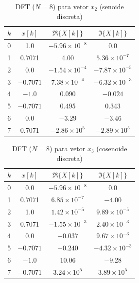 \documentclass[12pt,a4paper]{article}
\begin{document}
\begin{table}[H]
\centering
\small
\caption{DFT ($N=8$) para vetor $x_2$ (senoide discreta)}
\label{tab:dft_x2}
\begin{tabular}{@{}c c c c@{}}
\toprule
\textbf{$k$} & \textbf{$x[k]$} & \textbf{$\Re\{X[k]\}$} & \textbf{$\Im\{X[k]\}$} \\
\midrule
0 & 1.0     & $-5.96\times10^{-8}$ & 0.0 \\
1 & 0.7071  & 4.00              & $5.36\times10^{-7}$ \\
2 & 0.0     & $-1.54\times10^{-4}$ & $-7.87\times10^{-5}$ \\
3 & $-0.7071$ & $7.38\times10^{-4}$ & $-6.32\times10^{-3}$ \\
4 & $-1.0$  & 0.090             & $-0.024$ \\
5 & $-0.7071$ & 0.495             & 0.343 \\
6 & 0.0     & $-3.29$           & $-3.46$ \\
7 & 0.7071  & $-2.86\times10^{5}$ & $-2.89\times10^{5}$ \\
\bottomrule
\end{tabular}
\end{table}

\begin{table}[H]
\centering
\small
\caption{DFT ($N=8$) para vetor $x_3$ (cosenoide discreta)}
\label{tab:dft_x3}
\begin{tabular}{@{}c c c c@{}}
\toprule
\textbf{$k$} & \textbf{$x[k]$} & \textbf{$\Re\{X[k]\}$} & \textbf{$\Im\{X[k]\}$} \\
\midrule
0 & 0.0     & $-5.96\times10^{-8}$ & 0.0 \\
1 & 0.7071  & $6.85\times10^{-7}$ & $-4.00$ \\
2 & 1.0     & $1.42\times10^{-5}$ & $9.89\times10^{-5}$ \\
3 & 0.7071  & $-1.55\times10^{-3}$ & $2.40\times10^{-3}$ \\
4 & 0.0     & $-0.037$          & $9.67\times10^{-3}$ \\
5 & $-0.7071$ & $-0.240$          & $-4.32\times10^{-3}$ \\
6 & $-1.0$  & 10.06             & $-9.28$ \\
7 & $-0.7071$ & $3.24\times10^{5}$ & $3.89\times10^{5}$ \\
\bottomrule
\end{tabular}
\end{table}
\end{document}
